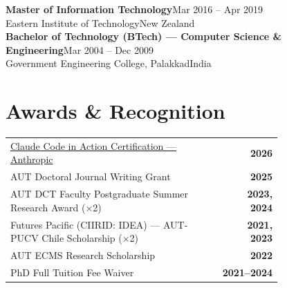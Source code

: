 \documentclass[10.5pt,a4paper]{article}
\newcommand{\edu}[4]{%
  {\bfseries #1}\hfill{\small\color{accent}#2}\\[-1pt]
  {\small\color{mid}#3}\hfill{\small\color{light}#4}\\[2pt]%
}
\begin{document}
\vspace{6pt}

\edu{Master of Information Technology}
    {Mar 2016 – Apr 2019}
    {Eastern Institute of Technology}
    {New Zealand}

\edu{Bachelor of Technology (BTech) — Computer Science \& Engineering}
    {Mar 2004 – Dec 2009}
    {Government Engineering College, Palakkad}
    {India}

\section{Awards \& Recognition}

\renewcommand{\arraystretch}{1.4}
\begin{tabular}{@{}p{0.78\linewidth}r@{}}
  \href{https://verify.skilljar.com/c/ngmh5b4cn9um}{Claude Code in Action Certification — Anthropic}
    & \textcolor{accent}{\small\bfseries 2026} \\
  AUT Doctoral Journal Writing Grant
    & \textcolor{accent}{\small\bfseries 2025} \\
  AUT DCT Faculty Postgraduate Summer Research Award {\small(×2)}
    & \textcolor{accent}{\small\bfseries 2023, 2024} \\
  Futures Pacific (CIIRID: IDEA) — AUT-PUCV Chile Scholarship {\small(×2)}
    & \textcolor{accent}{\small\bfseries 2021, 2023} \\
  AUT ECMS Research Scholarship
    & \textcolor{accent}{\small\bfseries 2022} \\
  PhD Full Tuition Fee Waiver
    & \textcolor{accent}{\small\bfseries 2021--2024} \\
\end{tabular}
\end{document}
